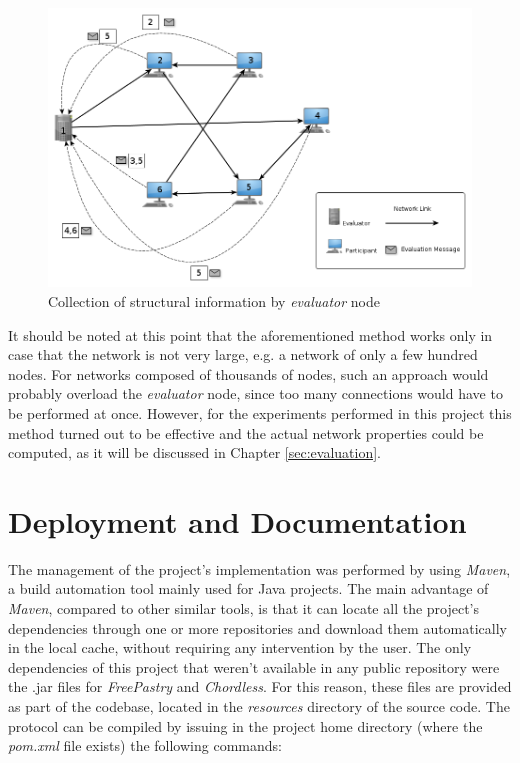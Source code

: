 \documentclass[a4paper,11pt,twoside]{report}
\begin{document}
\begin{figure}
   \centering
    \includegraphics[scale=0.5]{../figures/evaluator.png}
     \caption{Collection of structural information by \textit{evaluator} node}
     \label{fig:gather_eval}
\end{figure}

It should be noted at this point that the aforementioned method works only in case that the network is not very large, e.g. a network of only a few hundred nodes. For networks composed of thousands of nodes, such an approach would probably overload the \textit{evaluator} node, since too many connections would have to be performed at once. However, for the experiments performed in this project this method turned out to be effective and the actual network properties could be computed, as it will be discussed in Chapter \ref{sec:evaluation}.





\section{Deployment and Documentation}

The management of the project's implementation was performed by using \textit{Maven}, a build automation tool mainly used for Java projects. The main advantage of \textit{Maven}, compared to other similar tools, is that it can locate all the project's dependencies through one or more repositories and download them automatically in the local cache, without requiring any intervention by the user. The only dependencies of this project that weren't available in any public repository were the .jar files for \textit{FreePastry} and \textit{Chordless}. For this reason, these files are provided as part of the codebase, located in the \textit{resources} directory of the source code. The protocol can be compiled by issuing in the project home directory (where the \textit{pom.xml} file exists) the following commands:
\end{document}
